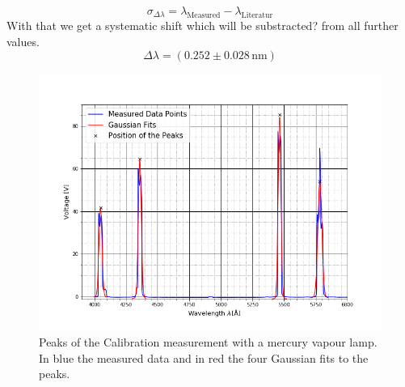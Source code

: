 \begin{equation}
	\sigma_{\Delta \lambda}=\lambda_{\text{Measured}} - \lambda_{\text{Literatur}}
\end{equation}
With that we get a systematic shift which will be substracted? from all further values. $$\Delta \lambda=(0.252\pm 0.028\,\text{nm})$$
\begin{figure}[ht]
	\includegraphics[scale=0.5]{Bild/QS.png}
	\centering
	\caption[Calibration with Mercury Vapour Lamp]{Peaks of the Calibration measurement with a mercury vapour lamp. In blue the measured data and in red the four Gaussian fits to the peaks.}
	\label{figEichung}
\end{figure}
